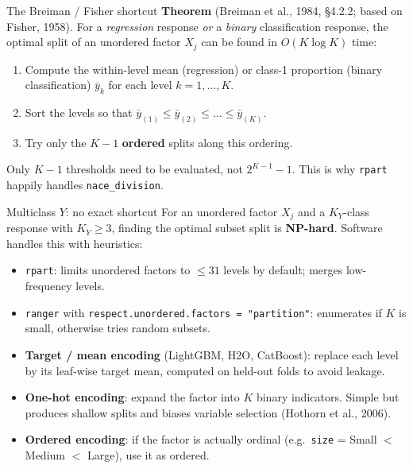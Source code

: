 \documentclass[10pt,ignorenonframetext,aspectratio=169]{beamer}
\begin{document}
\begin{frame}{The Breiman / Fisher shortcut}
\textbf{Theorem} (Breiman et al., 1984, \S 4.2.2; based on Fisher, 1958).
For a \emph{regression} response \emph{or} a \emph{binary} classification response, the optimal split of an unordered factor $X_j$ can be found in $O(K \log K)$ time:
\begin{enumerate}
    \justifying
    \item Compute the within-level mean (regression) or class-1 proportion (binary classification) $\bar y_k$ for each level $k = 1, \ldots, K$.
    \item Sort the levels so that $\bar y_{(1)} \le \bar y_{(2)} \le \ldots \le \bar y_{(K)}$.
    \item Try only the $K - 1$ \textbf{ordered} splits along this ordering.
\end{enumerate}

\medskip
\centering
{}

\medskip
\justifying
Only $K-1$ thresholds need to be evaluated, not $2^{K-1}-1$. This is why \texttt{rpart} happily handles \texttt{nace\_division}.
\end{frame}


\begin{frame}{Multiclass $Y$: no exact shortcut}
For an unordered factor $X_j$ and a $K_Y$-class response with $K_Y \ge 3$, finding the optimal subset split is \textbf{NP-hard}. Software handles this with heuristics:
\begin{itemize}
    \justifying
    \item \texttt{rpart}: limits unordered factors to $\le 31$ levels by default; merges low-frequency levels.
    \item \texttt{ranger} with \texttt{respect.unordered.factors = "partition"}: enumerates if $K$ is small, otherwise tries random subsets.
    \item \textbf{Target / mean encoding} (LightGBM, H2O, CatBoost): replace each level by its leaf-wise target mean, computed on held-out folds to avoid leakage.
    \item \textbf{One-hot encoding}: expand the factor into $K$ binary indicators. Simple but produces shallow splits and biases variable selection (Hothorn et al., 2006).
    \item \textbf{Ordered encoding}: if the factor is actually ordinal (e.g.\ \texttt{size} = Small $<$ Medium $<$ Large), use it as ordered.
\end{itemize}
\end{frame}
\end{document}
